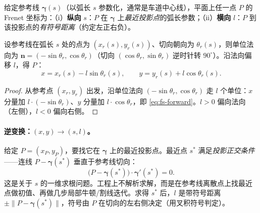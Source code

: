 \begin{definition}[Frenet 坐标]\label{def:fs-frenet}
给定参考线 $\boldsymbol{\gamma}(s)$（以弧长 $s$ 参数化，通常是车道中心线），平面上任一点 $P$ 的 Frenet 坐标为：（i）\textbf{纵向} $s$：$P$ 在 $\boldsymbol{\gamma}$ 上\emph{最近投影点}的弧长参数；（ii）\textbf{横向} $l$：$P$ 到该投影点的\emph{有符号距离}（约定左正右负）。
\end{definition}

\begin{theorem}\label{thm:fs-forward}
设参考线在弧长 $s$ 处的点为 $(x_r(s),y_r(s))$、切向朝向为 $\theta_r(s)$，则单位法向为 $\mathbf{n}=(-\sin\theta_r,\cos\theta_r)$（切向 $(\cos\theta_r,\sin\theta_r)$ 逆时针转 $90^\circ$）。沿法向偏移 $l$，得 $P$：
\begin{equation}
  x=x_r(s)-l\sin\theta_r(s),\qquad y=y_r(s)+l\cos\theta_r(s).
  \label{eq:fs-forward}
\end{equation}
\end{theorem}
\begin{proof}
从参考点 $(x_r,y_r)$ 出发，沿单位法向 $(-\sin\theta_r,\cos\theta_r)$ 走 $l$ 个单位：$x$ 分量加 $l\cdot(-\sin\theta_r)$、$y$ 分量加 $l\cdot\cos\theta_r$，即 \cref{eq:fs-forward}。$l>0$ 偏向法向（左侧），$l<0$ 偏向右侧。
\end{proof}

\paragraph{逆变换：$(x,y)\to(s,l)$。}
给定 $P=(x_P,y_P)$，要找它在 $\boldsymbol{\gamma}$ 上的最近投影点。最近点 $s^*$ 满足\emph{投影正交条件}——连线 $P-\boldsymbol{\gamma}(s^*)$ 垂直于参考线切向：
\begin{equation}
  \big(P-\boldsymbol{\gamma}(s^*)\big)\cdot\boldsymbol{\gamma}'(s^*)=0.
  \label{eq:fs-projection}
\end{equation}
这是关于 $s$ 的一维求根问题。工程上不解析求解，而是在参考线离散点上找最近点做初值、再做几步局部牛顿/割线迭代。求得 $s^*$ 后，$l$ 是带符号距离 $\pm\|P-\boldsymbol{\gamma}(s^*)\|$，符号由 $P$ 在切向的左右侧决定（用叉积符号判定）。

